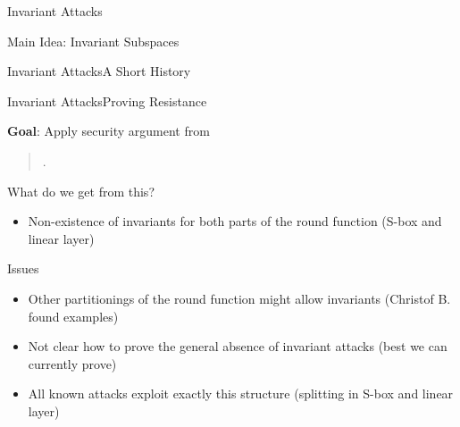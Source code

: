 \begin{frame}{Invariant Attacks}
\begin{block}{Main Idea: Invariant Subspaces}
    \end{block}
\end{frame}

\begin{frame}{Invariant Attacks}{A Short History}
    \begin{timeline}
    \end{timeline}
\end{frame}

\begin{frame}{Invariant Attacks}{Proving Resistance}
    \centering
    \begin{block}{\textbf{Goal}: Apply security argument from}
    \begin{quote}
        .
    \end{quote}
    \end{block}
    \begin{exampleblock}{What do we get from this?}
        \begin{itemize}
            \item Non-existence of invariants for both parts of the round function (S-box and linear layer)
        \end{itemize}
    \end{exampleblock}
    \begin{alertblock}{Issues}
    \begin{itemize}
        \item Other partitionings of the round function might allow invariants (Christof B\@. found examples)
        \item Not clear how to prove the general absence of invariant attacks (best we can currently prove)
        \item All known attacks exploit exactly this structure (splitting in S-box and linear layer)
    \end{itemize}
    \end{alertblock}
\end{frame}

